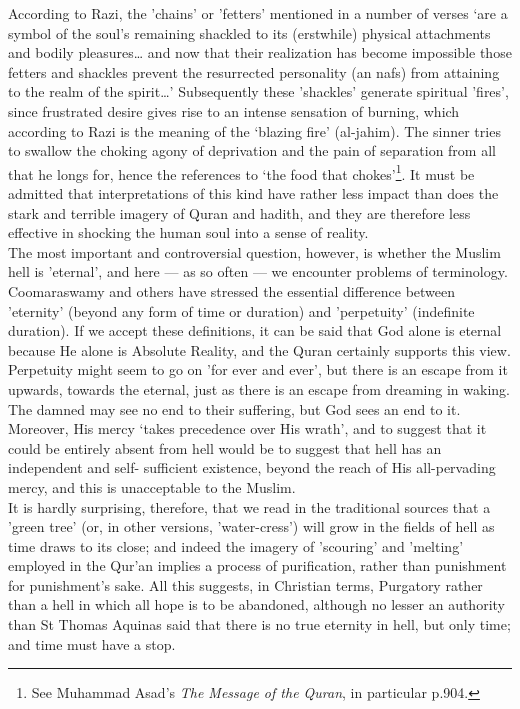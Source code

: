 \documentclass[10pt, twoside]{book}
\begin{document}
According to Razi, the 'chains' or 'fetters' mentioned in a number of verses `are a symbol of the 
soul's remaining shackled to its (erstwhile) physical attachments and bodily pleasures\ldots{} and now 
that their realization has become impossible those fetters and shackles prevent the resurrected 
personality (an nafs) from attaining to the realm of the spirit\ldots{}' Subsequently these 'shackles' 
generate spiritual 'fires', since frustrated desire gives rise to an intense sensation of burning, 
which according to Razi is the meaning of the `blazing fire' (al\hyp{}jahim). The sinner tries to swallow 
the choking agony of deprivation and the pain of separation from all that he longs for, hence the 
references to `the food that chokes'\footnote{See Muhammad Asad's \emph{The Message of the Quran}, in particular p.904.}. It must be admitted that interpretations of this kind have 
rather less impact than does the stark and terrible imagery of Quran and hadith, and they are 
therefore less effective in shocking the human soul into a sense of reality. \\

The most important and controversial question, however, is whether the Muslim hell is 'eternal', and 
here --- as so often --- we encounter problems of terminology. Coomaraswamy and others have stressed the 
essential difference between 'eternity' (beyond any form of time or duration) and 'perpetuity' 
(indefinite duration). If we accept these definitions, it can be said that God alone is eternal 
because He alone is Absolute Reality, and the Quran certainly supports this view. Perpetuity might 
seem to go on 'for ever and ever', but there is an escape from it upwards, towards the eternal, just 
as there is an escape from dreaming in waking. The damned may see no end to their suffering, but God 
sees an end to it. Moreover, His mercy `takes precedence over His wrath', and to suggest that it 
could be entirely absent from hell would be to suggest that hell has an independent and self\hyp{}
sufficient existence, beyond the reach of His all\hyp{}pervading mercy, and this is unacceptable to the 
Muslim. \\



It is hardly surprising, therefore, that we read in the traditional sources that a 'green tree' (or, 
in other versions, 'water\hyp{}cress') will grow in the fields of hell as time draws to its close; and 
indeed the imagery of 'scouring' and 'melting' employed in the Qur'an implies a process of 
purification, rather than punishment for punishment's sake. All this suggests, in Christian terms, 
Purgatory rather than a hell in which all hope is to be abandoned, although no lesser an authority 
than St Thomas Aquinas said that there is no true eternity in hell, but only time; and time must have 
a stop. \\
\end{document}
